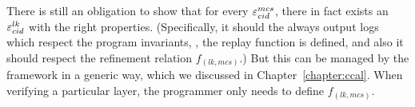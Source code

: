 There is still an obligation to show that for every ${\varepsilon}^{mcs}_{cid}$, there
in fact exists an ${\varepsilon}^{lk}_{cid}$ with the right
properties. (Specifically, it should the always output logs which
respect the program invariants, \ie, the replay function is defined,
and also it should respect the refinement relation $f_{(lk, mcs)}$.) But this can
be managed by the framework in a generic way, which we discussed in Chapter~\ref{chapter:ccal}. When
verifying a particular layer, the programmer only needs to define $f_{(lk, mcs)}$.

